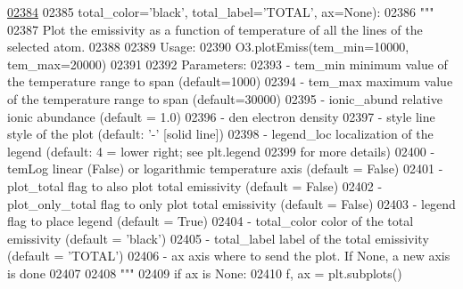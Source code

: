 \begin{DoxyCode}
\hypertarget{classpyneb_1_1core_1_1pynebcore_1_1_atom_l02384}{}\hyperlink{classpyneb_1_1core_1_1pynebcore_1_1_atom_adc2de658da17347204f430aff728650b}{02384} 
02385                   total\_color=\textcolor{stringliteral}{'black'}, total\_label=\textcolor{stringliteral}{'TOTAL'}, ax=\textcolor{keywordtype}{None}):
02386         \textcolor{stringliteral}{""" }
02387 \textcolor{stringliteral}{        Plot the emissivity as a function of temperature of all the lines of the selected atom.  }
02388 \textcolor{stringliteral}{}
02389 \textcolor{stringliteral}{        Usage: }
02390 \textcolor{stringliteral}{            O3.plotEmiss(tem\_min=10000, tem\_max=20000)}
02391 \textcolor{stringliteral}{        }
02392 \textcolor{stringliteral}{        Parameters:}
02393 \textcolor{stringliteral}{            - tem\_min         minimum value of the temperature range to span (default=1000)}
02394 \textcolor{stringliteral}{            - tem\_max         maximum value of the temperature range to span (default=30000)}
02395 \textcolor{stringliteral}{            - ionic\_abund     relative ionic abundance (default = 1.0)}
02396 \textcolor{stringliteral}{            - den             electron density}
02397 \textcolor{stringliteral}{            - style           line style of the plot (default: '-' [solid line])}
02398 \textcolor{stringliteral}{            - legend\_loc      localization of the legend (default: 4 = lower right; see plt.legend }
02399 \textcolor{stringliteral}{                                for more details)}
02400 \textcolor{stringliteral}{            - temLog          linear (False) or logarithmic temperature axis (default = False)}
02401 \textcolor{stringliteral}{            - plot\_total      flag to also plot total emissivity (default = False)}
02402 \textcolor{stringliteral}{            - plot\_only\_total flag to only plot total emissivity (default = False)}
02403 \textcolor{stringliteral}{            - legend          flag to place legend (default = True)}
02404 \textcolor{stringliteral}{            - total\_color     color of the total emissivity (default = 'black')}
02405 \textcolor{stringliteral}{            - total\_label     label of the total emissivity (default = 'TOTAL')}
02406 \textcolor{stringliteral}{            - ax              axis where to send the plot. If None, a new axis is done}
02407 \textcolor{stringliteral}{}
02408 \textcolor{stringliteral}{        """}
02409         \textcolor{keywordflow}{if} ax \textcolor{keywordflow}{is} \textcolor{keywordtype}{None}:
02410             f, ax = plt.subplots()

\end{DoxyCode}
